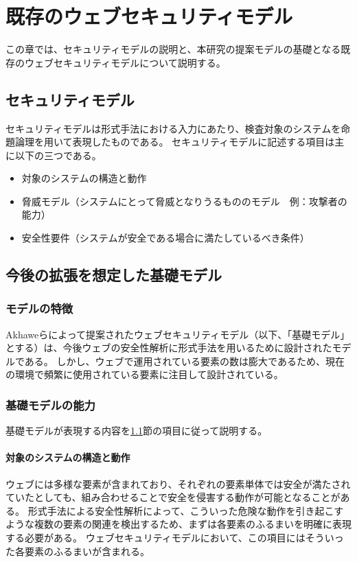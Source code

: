 \documentclass[12pt,a4paper]{jbook}
\begin{document}
\chapter{既存のウェブセキュリティモデル}
この章では、セキュリティモデルの説明と、本研究の提案モデルの基礎となる既存のウェブセキュリティモデルについて説明する。

\section{セキュリティモデル}
\label{sec:SecurityModel}
セキュリティモデルは形式手法における入力にあたり、検査対象のシステムを命題論理を用いて表現したものである。
セキュリティモデルに記述する項目は主に以下の三つである。
\begin{itemize}
\item 対象のシステムの構造と動作
\item 脅威モデル（システムにとって脅威となりうるもののモデル　例：攻撃者の能力）
\item 安全性要件（システムが安全である場合に満たしているべき条件）
\end{itemize}

\section{今後の拡張を想定した基礎モデル}
\label{sec:based-model}

\subsection{モデルの特徴}
\label{sec:based-model-abstract}
Akhaweらによって提案されたウェブセキュリティモデル\cite{based-model}（以下、「基礎モデル」とする）は、今後ウェブの安全性解析に形式手法を用いるために設計されたモデルである。
しかし、ウェブで運用されている要素の数は膨大であるため、現在の環境で頻繁に使用されている要素に注目して設計されている。

\subsection{基礎モデルの能力}
\label{sec:based-model-power}
基礎モデルが表現する内容を\ref{sec:SecurityModel}節の項目に従って説明する。

\subsubsection{対象のシステムの構造と動作}
ウェブには多様な要素が含まれており、それぞれの要素単体では安全が満たされていたとしても、組み合わせることで安全を侵害する動作が可能となることがある。
形式手法による安全性解析によって、こういった危険な動作を引き起こすような複数の要素の関連を検出するため、まずは各要素のふるまいを明確に表現する必要がある。
ウェブセキュリティモデルにおいて、この項目にはそういった各要素のふるまいが含まれる。
\end{document}
